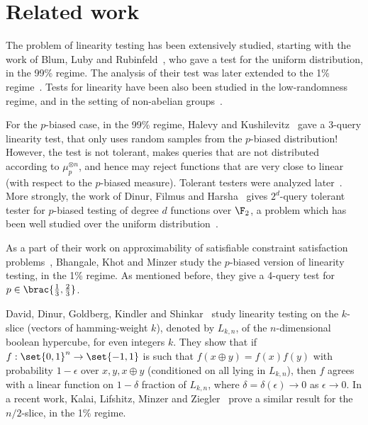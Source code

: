 \section{Related work}
The problem of linearity testing has been extensively studied, starting with the work of Blum, Luby and Rubinfeld~\cite{BLR93}, who gave a test for the uniform distribution, in the 99\% regime.
The analysis of their test was later extended to the 1\% regime~\cite{BCHKS96, KLX10}.
Tests for linearity have been also been studied in the low-randomness regime, and in the setting of non-abelian groups~\cite{BSVW03,BCLR08,SW06}.

For the $p$-biased case, in the 99\% regime, Halevy and Kushilevitz~\cite{HK07} gave a 3-query linearity test, that only uses random samples from the $p$-biased distribution!
However, the test is not tolerant, makes queries that are not distributed according to $\mu_p^{\otimes n}$, and hence may reject functions that are very close to linear (with respect to the $p$-biased measure).
Tolerant testers were analyzed later~\cite{KS09, DFH19}.
More strongly, the work of Dinur, Filmus and Harsha~\cite{DFH19} gives $2^d$-query tolerant tester for $p$-biased testing of degree $d$ functions over $\F_2$, a problem which has been well studied over the uniform distribution~\cite{AKKLR05, BKSSZ10}.

As a part of their work on approximability of satisfiable constraint satisfaction problems~\cite{BKM22, BKM23a, BKM23b, BKM24a, BKM24b}, Bhangale, Khot and Minzer study the $p$-biased version of linearity testing, in the 1\% regime.
As mentioned before, they give a 4-query test for $p\in \brac{\frac{1}{3},\frac{2}{3}}$. 

David, Dinur, Goldberg, Kindler and Shinkar~\cite{DDGKS17} study linearity testing on the $k$-slice (vectors of hamming-weight $k$), denoted by $L_{k,n}$, of the $n$-dimensional boolean hypercube, for even integers $k$. 
They show that if $f:\set{0,1}^n\to \set{-1,1}$ is such that $f(x\oplus y) = f(x)f(y)$ with probability $1-\epsilon$ over $x,y,x\oplus y$ (conditioned on all lying in $L_{k,n}$), then $f$ agrees with a linear function on $1-\delta$ fraction of $L_{k,n}$, where $\delta = \delta(\epsilon)\to 0$ as $\epsilon \to 0$.
In a recent work, Kalai, Lifshitz, Minzer and Ziegler~\cite{KLMZ24} prove a similar result for the $n/2$-slice, in the 1\% regime.